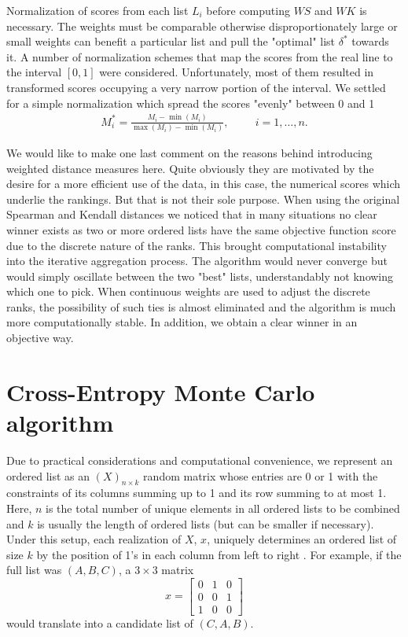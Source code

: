 \documentclass[11pt]{article}
\begin{document}
    Normalization of scores from each list $L_i$ before computing $WS$ and $WK$ is necessary. The weights must
    be comparable otherwise disproportionately large or small weights can benefit a particular list and pull the
    "optimal" list $\delta^*$ towards it. A number of normalization schemes that map the scores from the real line to 
    the interval $[0,1]$ were considered. Unfortunately, most of them resulted in transformed scores occupying a 
    very narrow portion of the interval. We settled for a simple normalization which spread the scores "evenly" between 0 and 1
    \begin{eqnarray*}
   M_i^* = \frac{M_i-\min(M_i)}{\max(M_i)-\min(M_i)}, \hspace{1cm} i=1,\ldots,n.
    \end{eqnarray*}  
    
We would like to make one last comment on the reasons behind introducing weighted distance measures here. Quite obviously they are 
 motivated by the desire for a more efficient use of the data, in this case, the numerical scores which underlie the rankings. But 
 that is not their sole purpose. When using the original Spearman and Kendall distances we noticed that in many situations no clear
 winner exists as two or more ordered lists have the same objective function score due to the discrete nature of the ranks.
 This brought computational instability into the 
 iterative aggregation process. The algorithm would never converge but would simply oscillate between the two "best" lists, understandably not knowing
 which one to pick. When continuous weights are used to adjust the discrete ranks, the possibility of such ties is almost eliminated and the
 algorithm is much more computationally stable. In addition, we obtain a clear winner in an objective way.  
    
\section{Cross-Entropy Monte Carlo algorithm}
        Due to practical considerations and computational convenience, we represent an ordered list as an        
        $(X)_{n\times k}$ random matrix
        whose entries are 0 or 1 with the constraints of its columns
        summing up to 1 and its row summing to at most 1. Here, $n$ is the total number of unique elements in
        all ordered lists to be combined and $k$ is usually the length of ordered lists (but can be smaller if necessary).
        Under this setup, each realization of $X$, $x$, uniquely determines
        an ordered list of size $k$ by the position of 1's in each
        column from left to right \cite{Lin06}. For example, if the full list was
        $(A, B, C)$, a $3\times 3$ matrix
        \begin{equation*}
        x=
        \begin{bmatrix}
        0 & 1 & 0\\
        0 & 0 & 1\\
        1 & 0 & 0
        \end{bmatrix}
        \end{equation*}
        would translate into a candidate list of $(C, A, B)$.
\end{document}
